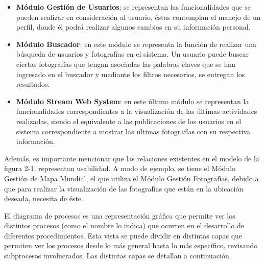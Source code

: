 \documentclass{memoria}
\begin{document}
\begin{itemize}
\item \textbf{Módulo Gestión de Usuarios}: se representan las funcionalidades que se pueden realizar en consideración al usuario, éstas contemplan el manejo de un perfil, donde él podrá realizar algunos cambios en su información personal.

\item \textbf{Módulo Buscador}: en este módulo se representa la función de realizar una búsqueda de usuarios y fotografías en el sistema. Un usuario puede buscar ciertas fotografías que tengan asociadas las palabras claves que se han ingresado en el buscador y mediante los filtros necesarios, se entregan los resultados.

\item \textbf{Módulo Stream Web System}: en este último módulo se representan la funcionalidades correspondientes a la visualización de las últimas actividades realizadas, siendo el equivalente a las publicaciones de los usuarios en el sistema correspondiente a mostrar las ultimas fotografías con su respectiva información.
\end{itemize}

Además, es importante mencionar que las relaciones existentes en el modelo de la figura 2-1, representan usabilidad. A modo de ejemplo, se tiene el Módulo Gestión de Mapa Mundial, el que utiliza el Módulo Gestión Fotografías, debido a que para realizar la visualización de las fotografías que están en la ubicación deseada, necesita de éste. 


El diagrama de procesos es una representación gráfica que permite ver los distintos procesos (como el nombre lo indica) que ocurren en el desarrollo de diferentes procedimientos. Esta vista se puede dividir en distintas capas que permiten ver los procesos desde lo más general hasta lo más específico, revisando subprocesos involucrados. Las distintas capas se detallan a continuación.


\end{document}
